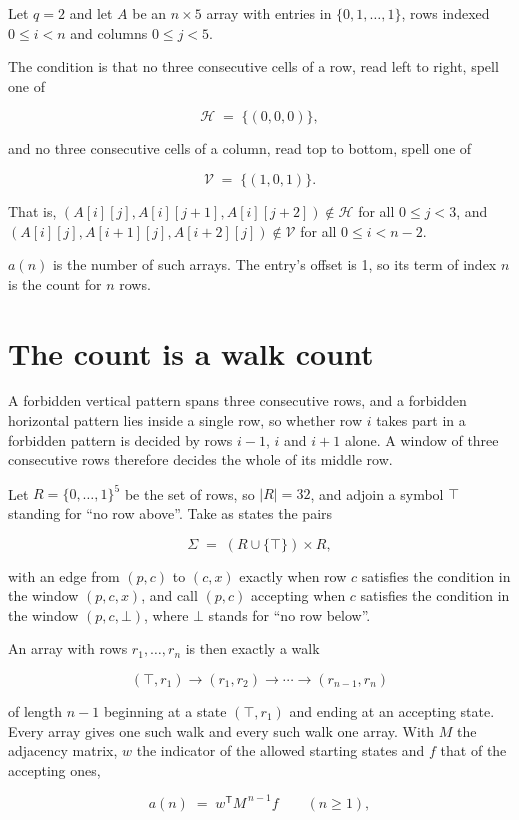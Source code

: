 \documentclass[11pt]{article}
\theoremstyle{definition}
\begin{document}
Let $q = 2$ and let $A$ be an $n \times 5$ array with entries in $\{0,1,\dots,1\}$, rows indexed $0 \le i < n$ and columns $0 \le j < 5$.

The condition is that no three consecutive cells of a row, read left to right, spell one of

\[\mathcal{H} \;=\; \{(0,0,0)\},\]

and no three consecutive cells of a column, read top to bottom, spell one of

\[\mathcal{V} \;=\; \{(1,0,1)\}.\]

That is, $(A[i][j],A[i][j{+}1],A[i][j{+}2]) \notin \mathcal{H}$ for all $0 \le j < 3$, and $(A[i][j],A[i{+}1][j],A[i{+}2][j]) \notin \mathcal{V}$ for all $0 \le i < n-2$.

$a(n)$ is the number of such arrays. The entry's offset is 1, so its term of index $n$ is the count for $n$ rows.

\section{The count is a walk count}

A forbidden vertical pattern spans three consecutive rows, and a forbidden horizontal pattern lies inside a single row, so whether row $i$ takes part in a forbidden pattern is decided by rows $i-1$, $i$ and $i+1$ alone. A window of three consecutive rows therefore decides the whole of its middle row.

Let $R = \{0,\dots,1\}^{5}$ be the set of rows, so $|R| = 32$, and adjoin a symbol $\top$ standing for ``no row above''. Take as states the pairs

\[\Sigma \;=\; (R \cup \{\top\}) \times R,\]

with an edge from $(p,c)$ to $(c,x)$ exactly when row $c$ satisfies the condition in the window $(p,c,x)$, and call $(p,c)$ accepting when $c$ satisfies the condition in the window $(p,c,\bot)$, where $\bot$ stands for ``no row below''.

An array with rows $r_1,\dots,r_n$ is then exactly a walk

\[(\top,r_1) \to (r_1,r_2) \to \cdots \to (r_{n-1},r_n)\]

of length $n-1$ beginning at a state $(\top,r_1)$ and ending at an accepting state. Every array gives one such walk and every such walk one array. With $M$ the adjacency matrix, $w$ the indicator of the allowed starting states and $f$ that of the accepting ones,

\[a(n) \;=\; w^{\mathsf T} M^{\,n-1} f \qquad (n \ge 1),\]
\end{document}
